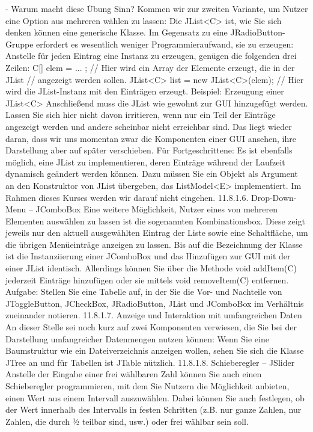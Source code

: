 -	Warum macht diese Übung Sinn?
Kommen wir zur zweiten Variante, um Nutzer eine Option aus mehreren wählen zu lassen: Die JList<C> ist, wie Sie sich denken können eine generische Klasse. Im Gegensatz zu eine JRadioButton-Gruppe erfordert es wesentlich weniger Programmieraufwand, sie zu erzeugen: Anstelle für jeden Eintrag eine Instanz zu erzeugen, genügen die folgenden drei Zeilen:
C[] elem = { ... };    // Hier wird ein Array der Elemente erzeugt, die in der JList 
// angezeigt werden sollen.
JList<C> list = new JList<C>(elem);     // Hier wird die JList-Instanz mit den Einträgen erzeugt.
Beispiel: Erzeugung einer JList<C>
Anschließend muss die JList wie gewohnt zur GUI hinzugefügt werden.
Lassen Sie sich hier nicht davon irritieren, wenn nur ein Teil der Einträge angezeigt werden und andere scheinbar nicht erreichbar sind. Das liegt wieder daran, dass wir uns momentan zwar die Komponenten einer GUI ansehen, ihre Darstellung aber auf später verschieben.
Für Fortgeschrittene: Es ist ebenfalls möglich, eine JList zu implementieren, deren Einträge während der Laufzeit dynamisch geändert werden können. Dazu müssen Sie ein Objekt als Argument an den Konstruktor von JList übergeben, das ListModel<E> implementiert. Im Rahmen dieses Kurses werden wir darauf nicht eingehen.
11.8.1.6.	Drop-Down-Menu – JComboBox
Eine weitere Möglichkeit, Nutzer eines von mehreren Elementen auswählen zu lassen ist die sogenannten Kombinationsbox. Diese zeigt jeweils nur den aktuell ausgewählten Eintrag der Liste sowie eine Schaltfläche, um die übrigen Menüeinträge anzeigen zu lassen.
Bis auf die Bezeichnung der Klasse ist die Instanziierung einer JComboBox und das Hinzufügen zur GUI mit der einer JList identisch. Allerdings können Sie über die Methode void addItem(C) jederzeit Einträge hinzufügen oder sie mittels void removeItem(C) entfernen.
Aufgabe:
Stellen Sie eine Tabelle auf, in der Sie die Vor- und Nachteile von JToggleButton, JCheckBox, JRadioButton, JList und JComboBox im Verhältnis zueinander notieren.
11.8.1.7.	Anzeige und Interaktion mit umfangreichen Daten
An dieser Stelle sei noch kurz auf zwei Komponenten verwiesen, die Sie bei der Darstellung umfangreicher Datenmengen nutzen können: Wenn Sie eine Baumstruktur wie ein Dateiverzeichnis anzeigen wollen, sehen Sie sich die Klasse JTree an und für Tabellen ist JTable nützlich.
11.8.1.8.	Schieberegler – JSlider
Anstelle der Eingabe einer frei wählbaren Zahl können Sie auch einen Schieberegler programmieren, mit dem Sie Nutzern die Möglichkeit anbieten, einen Wert aus einem Intervall auszuwählen. Dabei können Sie auch festlegen, ob der Wert innerhalb des Intervalls in festen Schritten (z.B. nur ganze Zahlen, nur Zahlen, die durch ½ teilbar sind, usw.) oder frei wählbar sein soll.
